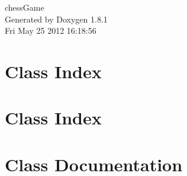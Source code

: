 \documentclass{book}
\begin{document}
\begin{titlepage}
\vspace*{7cm}
\begin{center}
{\Large chess\-Game }\\
\vspace*{1cm}
{\large Generated by Doxygen 1.8.1}\\
\vspace*{0.5cm}
{\small Fri May 25 2012 16:18:56}\\
\end{center}
\end{titlepage}
\clearemptydoublepage
{}
\tableofcontents
\clearemptydoublepage
{}
\chapter{Class Index}

\chapter{Class Index}

\chapter{Class Documentation}

























\printindex
\end{document}

